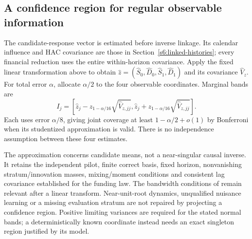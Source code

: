 \subsection{A confidence region for regular observable information}
The candidate-response vector is estimated before inverse linkage. Its
calendar influence and HAC covariance are those in
Section~\ref{s6:linked-histories}; every financial reduction uses the entire
within-horizon covariance. Apply the fixed linear transformation above to
obtain $\widehat z=(\widehat S_0,\widehat D_0,
\widehat S_1,\widehat D_1)$ and its covariance $\widehat V_z$.
For total error $\alpha$, allocate $\alpha/2$ to the four observable
coordinates. Marginal bands are
\begin{equation}
 I_j=\left[\widehat z_j-z_{1-\alpha/16}\sqrt{\widehat V_{z,jj}},
                 \widehat z_j+z_{1-\alpha/16}\sqrt{\widehat V_{z,jj}}\right].
 \label{s61:primitive-bands}
\end{equation}
Each uses error $\alpha/8$, giving joint coverage at least
$1-\alpha/2+o(1)$ by Bonferroni when its studentized approximation is valid.
There is no independence assumption between these four estimates.

The approximation concerns candidate means, not a near-singular causal
inverse. It retains the independent pilot, finite correct basis, fixed
horizon, nonvanishing stratum/innovation masses, mixing/moment conditions
and consistent lag covariance established for the funding law. The
bandwidth conditions of \citet[Theorem 2]{newey1986} remain relevant after a
linear transform. Near-unit-root dynamics, unqualified nuisance learning or
a missing evaluation stratum are not repaired by projecting a confidence
region. Positive limiting variances are required for the stated normal
bands; a deterministically known coordinate instead needs an exact
singleton region justified by its model.

